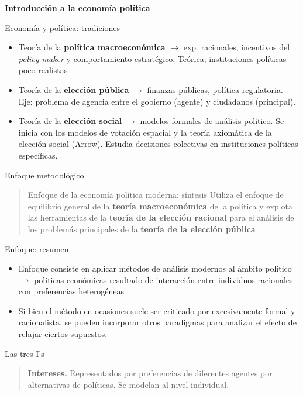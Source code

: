 \documentclass[
  ignorenonframetext,
]{beamer}
\providecommand{\tightlist}{%
  \setlength{\itemsep}{0pt}\setlength{\parskip}{0pt}}\usepackage{longtable,booktabs,array}
\begin{document}
\begin{frame}{\textbf{Introducción a la economía política}}
\begin{block}{Economía y política: tradiciones}
\begin{itemize}
  \begin{itemize}
  \tightlist
  \item
    Teoría de la \textbf{política macroeconómica} \(\longrightarrow\)
    exp. racionales, incentivos del \emph{policy maker} y comportamiento
    estratégico. Teórica; instituciones políticas poco realistas
  \item
    Teoría de la \textbf{elección pública} \(\longrightarrow\) finanzas
    públicas, política regulatoria. Eje: problema de agencia entre el
    gobierno (agente) y ciudadanos (principal).
  \item
    Teoría de la \textbf{elección social} \(\longrightarrow\) modelos
    formales de análisis político. Se inicia con los modelos de votación
    espacial y la teoría axiomática de la elección social (Arrow).
    Estudia decisiones colectivas en instituciones políticas
    específicas.
  \end{itemize}
\end{itemize}
\end{block}

\begin{block}{Enfoque metodológico}
\protect\hypertarget{enfoque-metodoluxf3gico}{}
\begin{quote}
Enfoque de la economía política moderna: síntesis Utiliza el enfoque de
equilibrio general de la \textbf{teoría macroeconómica} de la política y
explota las herramientas de la \textbf{teoría de la elección racional}
para el análisis de los problemás principales de la \textbf{teoría de la
elección pública}
\end{quote}
\end{block}

\begin{block}{Enfoque: resumen}
\protect\hypertarget{enfoque-resumen}{}
\begin{itemize}
\tightlist
\item
  Enfoque consiste en aplicar métodos de análisis modernos al ámbito
  político \(\longrightarrow\) politicas económicas resultado de
  interacción entre individuos racionales con preferencias heterogéneas
\item
  Si bien el método en ocasiones suele ser criticado por excesivamente
  formal y racionalista, se pueden incorporar otros paradigmas para
  analizar el efecto de relajar ciertos supuestos.
\end{itemize}
\end{block}

\begin{block}{Las tres I's}
\protect\hypertarget{las-tres-is}{}
\begin{quote}
\textbf{Intereses.} Representados por preferencias de diferentes agentes
por alternativas de políticas. Se modelan al nivel individual.
\end{quote}


\end{block}
\end{frame}
\end{document}
